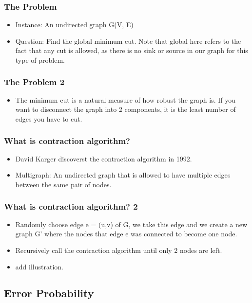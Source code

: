 \documentclass{beamer}
\begin{document}
\begin{frame}
\frametitle{The Problem}
\begin{itemize}
		\item Instance: An undirected graph G(V, E)
		\item Question: Find the global minimum cut. Note that global here refers to the fact that any cut is allowed, as there is no sink or source in our graph for this type of problem.
\end{itemize}
\end{frame}

\begin{frame}
\frametitle{The Problem 2}
\begin{itemize}
		\item The minimum cut is a natural measure of how robust the graph is. If you want to disconnect the graph into 2 components, it is the least number of edges you have to cut.
\end{itemize}
\end{frame}

\begin{frame}
\frametitle{What is contraction algorithm?}
\begin{itemize}
	\item David Karger discoverst the contraction algorithm in 1992.
	\item Multigraph: An undirected graph that is allowed to have multiple edges between the same pair of nodes.
\end{itemize}
\end{frame}

\begin{frame}
\frametitle{What is contraction algorithm? 2}
\begin{itemize}
	\item Randomly choose edge e = (u,v) of G, we take this edge and we create a new graph G' where the nodes that edge e was connected to become one node. 
	\item Recursively call the contraction algorithm until only 2 nodes are left. 
	\item add illustration.
\end{itemize}
\end{frame}






\subsection{Error Probability}
\end{document}
